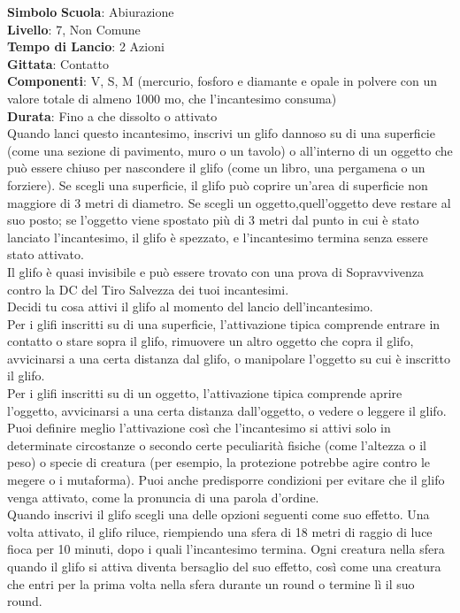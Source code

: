 \begin{multicols}{2}
\medskip\textbf{Simbolo}
\textbf{Scuola}: Abiurazione\\
\textbf{Livello}: 7, Non Comune\\
\textbf{Tempo di Lancio}: 2 Azioni\\
\textbf{Gittata}: Contatto\\
\textbf{Componenti}: V, S, M (mercurio, fosforo e diamante e opale in polvere con un valore totale di almeno 1000 mo, che l'incantesimo consuma)\\
\textbf{Durata}: Fino a che dissolto o attivato\\
Quando lanci questo incantesimo, inscrivi un glifo dannoso su di una superficie (come una sezione di pavimento, muro o un tavolo) o all'interno di un oggetto che può essere chiuso per nascondere il glifo (come un libro, una pergamena o un forziere). Se scegli una superficie, il glifo può coprire un'area di superficie non maggiore di 3 metri di diametro. Se scegli un oggetto,quell'oggetto deve restare al suo posto; se l'oggetto viene spostato più di 3 metri dal punto in cui è stato lanciato l'incantesimo, il glifo è spezzato, e l'incantesimo termina senza essere stato attivato.\\
Il glifo è quasi invisibile e può essere trovato con una prova di Sopravvivenza contro la DC del Tiro Salvezza dei tuoi incantesimi.\\
Decidi tu cosa attivi il glifo al momento del lancio dell'incantesimo.\\
Per i glifi inscritti su di una superficie, l'attivazione tipica comprende entrare in contatto o stare sopra il glifo, rimuovere un altro oggetto che copra il glifo, avvicinarsi a una certa distanza dal glifo, o manipolare l'oggetto su cui è inscritto il glifo.\\
Per i glifi inscritti su di un oggetto, l'attivazione tipica comprende aprire l'oggetto, avvicinarsi a una certa distanza dall'oggetto, o vedere o leggere il glifo.\\
Puoi definire meglio l'attivazione così che l'incantesimo si attivi solo in determinate circostanze o secondo certe peculiarità fisiche (come l'altezza o il peso) o specie di creatura (per esempio, la protezione potrebbe agire contro le megere o i mutaforma). Puoi anche predisporre condizioni per evitare che il glifo venga attivato, come la pronuncia di una parola d'ordine.\\
Quando inscrivi il glifo scegli una delle opzioni seguenti come suo effetto. Una volta attivato, il glifo riluce, riempiendo una sfera di 18 metri di raggio di luce fioca per 10 minuti, dopo i quali l'incantesimo termina. Ogni creatura nella sfera quando il glifo si attiva diventa bersaglio del suo effetto, così come una creatura che entri per la prima volta nella sfera durante un round o termine lì il suo round.\\


\end{multicols}
